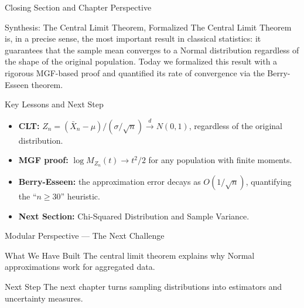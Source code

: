 \documentclass[aspectratio=169,xcolor={dvipsnames,table}]{beamer}
\begin{document}
\begin{frame}{Closing Section and Chapter Perspective}
	\vspace{-0.2cm}
	\begin{block}{Synthesis: The Central Limit Theorem, Formalized}
		\scriptsize
		The Central Limit Theorem is, in a precise sense, the most important result in classical statistics: it guarantees that the sample mean converges to a Normal distribution regardless of the shape of the original population. Today we formalized this result with a rigorous MGF-based proof and quantified its rate of convergence via the Berry-Esseen theorem.
	\end{block}
	\vspace{0.05cm}
	\pause
	\begin{alertblock}{Key Lessons and Next Step}
		\begin{itemize}\itemsep=0.05cm
			\item \textbf{CLT:} $Z_n = (\bar{X}_n-\mu)/(\sigma/\sqrt{n}) \xrightarrow{d} N(0,1)$, regardless of the original distribution.
			\item \textbf{MGF proof:} $\log M_{Z_n}(t) \to t^2/2$ for any population with finite moments.
			\item \textbf{Berry-Esseen:} the approximation error decays as $O(1/\sqrt{n})$, quantifying the ``$n\ge30$'' heuristic.
			\item \textbf{Next Section:} \textcolor{TecRojo}{Chi-Squared Distribution and Sample Variance}.
		\end{itemize}
	\end{alertblock}
\end{frame}

\begin{frame}{Modular Perspective --- The Next Challenge}
  \small
  \begin{block}{What We Have Built}
    The central limit theorem explains why Normal approximations work for aggregated data.
  \end{block}
  \pause
  \begin{alertblock}{Next Step}
    The next chapter turns sampling distributions into estimators and uncertainty measures.
  \end{alertblock}
\end{frame}
\end{document}
